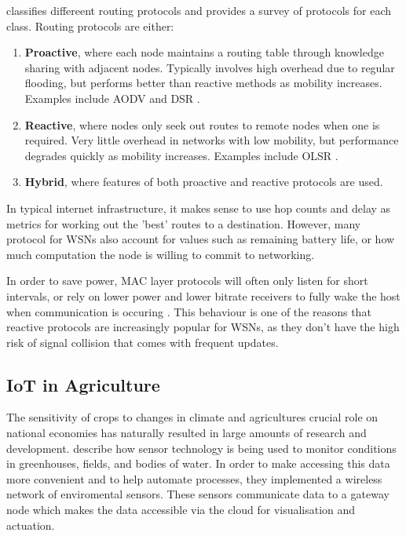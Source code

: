 \documentclass[12pt]{article}
\begin{document}
\cite{hassan} classifies differeent routing protocols and provides a survey of protocols for each class. Routing protocols are either:
\begin{enumerate}
    \item \textbf{Proactive}, where each node maintains a routing table through knowledge sharing with adjacent nodes. Typically involves high overhead due to regular flooding, but performs better than reactive methods as mobility increases.
        Examples include AODV \cite{aodv} and DSR \cite{dsr}.

    \item \textbf{Reactive}, where nodes only seek out routes to remote nodes when one is required. Very little overhead in networks with low mobility, but performance degrades quickly as mobility increases.
        Examples include OLSR \cite{olsr}.
    \item \textbf{Hybrid}, where features of both proactive and reactive protocols are used.
\end{enumerate}

In typical internet infrastructure, it makes sense to use hop counts and delay as metrics for working out the 'best' routes to a destination. However, many protocol for WSNs also account for values such as remaining battery life, or how much computation the node is willing to commit to networking. 

In order to save power, MAC layer protocols will often only listen for short intervals, or rely on lower power and lower bitrate receivers to fully wake the host when communication is occuring \cite{offon}. This behaviour is one of the reasons that reactive protocols are increasingly popular for WSNs, as they don't have the high risk of signal collision that comes with frequent updates.

\subsection{IoT in Agriculture}

The sensitivity of crops to changes in climate and agricultures crucial role on national economies has naturally resulted in large amounts of research and development. \cite{agrisensor} describe how sensor technology is being used to monitor conditions in greenhouses, fields, and bodies of water. In order to make accessing this data more convenient and to help automate processes, they implemented a wireless network of enviromental sensors. These sensors communicate data to a gateway node which makes the data accessible via the cloud for visualisation and actuation. 
\end{document}
